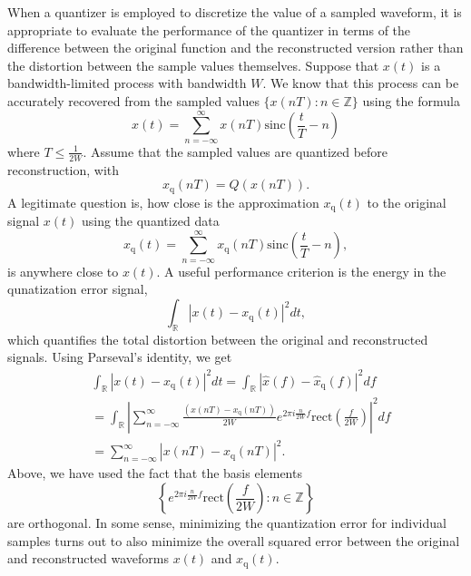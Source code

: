 When a quantizer is employed to discretize the value of a sampled waveform, it is appropriate to evaluate the performance of the quantizer in terms of the difference between the original function and the reconstructed version rather than the distortion between the sample values themselves.
Suppose that $x(t)$ is a bandwidth-limited process with bandwidth $W$.
We know that this process can be accurately recovered from the sampled values $\{ x(nT) : n \in \mathbb{Z} \}$ using the formula
\begin{equation*}
x(t) = \sum_{n = -\infty}^{\infty} x(nT) \mathrm{sinc} \left( \frac{t}{T} - n \right)
\end{equation*}
where $T \leq \frac{1}{2W}$.
Assume that the sampled values are quantized before reconstruction, with
\begin{equation*}
x_{\mathrm{q}} (nT) = Q ( x(nT) ) .
\end{equation*}
A legitimate question is, how close is the approximation $x_{\mathrm{q}}(t)$ to the original signal $x(t)$ using the quantized data
\begin{equation*}
x_{\mathrm{q}}(t) = \sum_{n = -\infty}^{\infty} x_{\mathrm{q}}(nT) \mathrm{sinc} \left( \frac{t}{T} - n \right) ,
\end{equation*}
is anywhere close to $x(t)$.
A useful performance criterion is the energy in the qunatization error signal,
\begin{equation*}
\int_{\mathbb{R}} \left| x(t) - x_{\mathrm{q}} (t) \right|^2 dt ,
\end{equation*}
which quantifies the total distortion between the original and reconstructed signals.
Using Parseval's identity, we get
\begin{equation*}
\begin{split}
&\int_{\mathbb{R}} \left|  x(t) - x_{\mathrm{q}} (t) \right|^2 dt
= \int_{\mathbb{R}} \left| \hat{x} (f) - \hat{x}_{\mathrm{q}} (f) \right|^2 df \\
&= \int_{\mathbb{R}} \left| \sum_{n = -\infty}^{\infty}
\frac{\left( x(nT) - x_{\mathrm{q}}(nT) \right)}{2W} e^{2 \pi i \frac{n}{2 W} f}
\mathrm{rect} \left( \frac{f}{2W} \right) \right|^2 df \\
&= \sum_{n = -\infty}^{\infty}
| x(nT) - x_{\mathrm{q}}(nT) |^2 .
\end{split}
\end{equation*}
Above, we have used the fact that the basis elements
\begin{equation*}
\left\{ e^{2 \pi i \frac{n}{2 W} f} \mathrm{rect} \left( \frac{f}{2W} \right) : n \in \mathbb{Z} \right\}
\end{equation*}
are orthogonal.
In some sense, minimizing the quantization error for individual samples turns out to also minimize the overall squared error between the original and reconstructed waveforms $x(t)$ and $x_{\mathrm{q}}(t)$.


